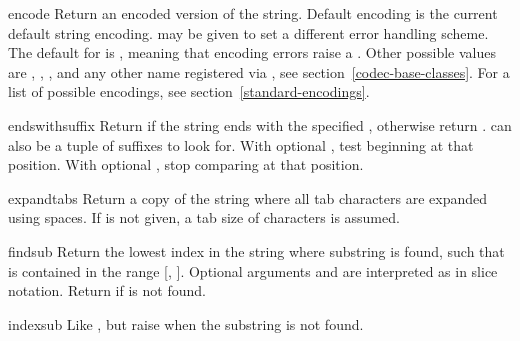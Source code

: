 \begin{methoddesc}[string]{encode}{}
Return an encoded version of the string.  Default encoding is the current
default string encoding.   may be given to set a different
error handling scheme.  The default for  is
, meaning that encoding errors raise a
.  Other possible values are ,
, , 
and any other name registered via ,
see section~\ref{codec-base-classes}.
For a list of possible encodings, see section~\ref{standard-encodings}.
\end{methoddesc}

\begin{methoddesc}[string]{endswith}{suffix}
Return  if the string ends with the specified ,
otherwise return .   can also be a tuple of
suffixes to look for.  With optional , test beginning at
that position.  With optional , stop comparing at that position.

\end{methoddesc}

\begin{methoddesc}[string]{expandtabs}{}
Return a copy of the string where all tab characters are expanded
using spaces.  If  is not given, a tab size of 
characters is assumed.
\end{methoddesc}

\begin{methoddesc}[string]{find}{sub}
Return the lowest index in the string where substring  is
found, such that  is contained in the range [,
].  Optional arguments  and  are
interpreted as in slice notation.  Return  if  is
not found.
\end{methoddesc}

\begin{methoddesc}[string]{index}{sub}
Like , but raise  when the
substring is not found.
\end{methoddesc}

